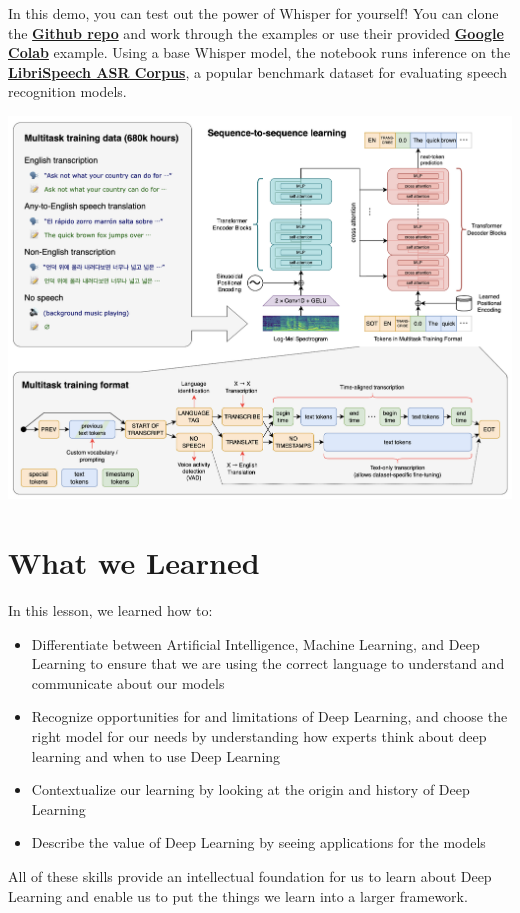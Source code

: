 In this demo, you can test out the power of Whisper for yourself! You can clone the \href{https://github.com/openai/whisper}{\textbf{Github repo}} and work through the examples or use their provided \href{https://colab.research.google.com/github/openai/whisper/blob/master/notebooks/LibriSpeech.ipynb}{\textbf{Google Colab}} example. Using a base Whisper model, the notebook runs inference on the \href{http://www.danielpovey.com/files/2015_icassp_librispeech.pdf}{\textbf{LibriSpeech ASR Corpus}}, a popular benchmark dataset for evaluating speech recognition models.

\includegraphics[width=1\linewidth]{img//intro/openai-whisper-architecture.png}

\section{What we Learned}

In this lesson, we learned how to:

\begin{itemize}
    \item Differentiate between Artificial Intelligence, Machine Learning, and Deep Learning to ensure that we are using the correct language to understand and communicate about our models
    \item Recognize opportunities for and limitations of Deep Learning, and choose the right model for our needs by understanding how experts think about deep learning and when to use Deep Learning
    \item Contextualize our learning by looking at the origin and history of Deep Learning
    \item Describe the value of Deep Learning by seeing applications for the models
\end{itemize}
All of these skills provide an intellectual foundation for us to learn about Deep Learning and enable us to put the things we learn into a larger framework.

